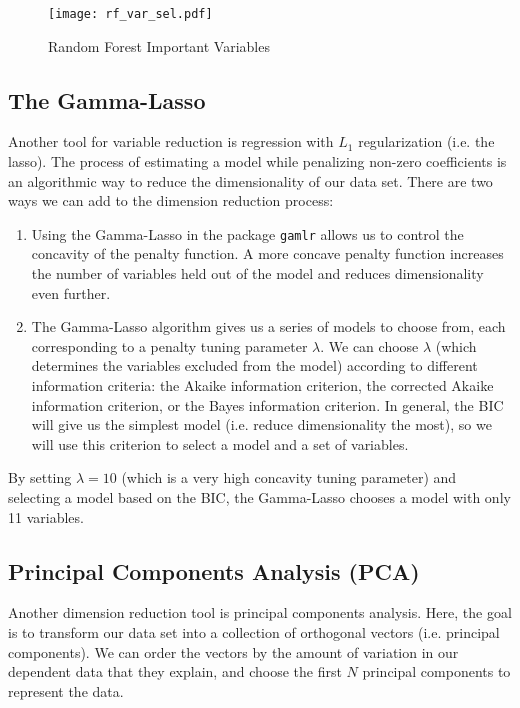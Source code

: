 \documentclass[11pt, fleqn]{article}
\begin{document}
\begin{figure}[!htb]
  \centering
  \caption{Random Forest Important Variables}
  \texttt{[image: rf\_var\_sel.pdf]}
  \label{fig:rf_var_sel}
\end{figure}


\subsection{The Gamma-Lasso}

Another tool for variable reduction is regression with $L_1$ regularization (i.e. the lasso). The process of estimating a model while penalizing non-zero coefficients is an algorithmic way to reduce the dimensionality of our data set. There are two ways we can add to the dimension reduction process:
\begin{enumerate}
\item Using the Gamma-Lasso in the package \texttt{gamlr} allows us to control the concavity of the penalty function. A more concave penalty function increases the number of variables held out of the model and reduces dimensionality even further.
\item The Gamma-Lasso algorithm gives us a series of models to choose from, each corresponding to a penalty tuning parameter $\lambda$. We can choose $\lambda$ (which determines the variables excluded from the model) according to different information criteria: the Akaike information criterion, the corrected Akaike information criterion, or the Bayes information criterion. In general, the BIC will give us the simplest model (i.e. reduce dimensionality the most), so we will use this criterion to select a model and a set of variables.
\end{enumerate}
By setting $\lambda=10$ (which is a very high concavity tuning parameter) and selecting a model based on the BIC, the Gamma-Lasso chooses a model with only 11 variables.

\subsection{Principal Components Analysis (PCA)}

Another dimension reduction tool is principal components analysis. Here, the goal is to transform our data set into a collection of orthogonal vectors (i.e. principal components). We can order the vectors by the amount of variation in our dependent data that they explain, and choose the first $N$ principal components to represent the data.
\end{document}

